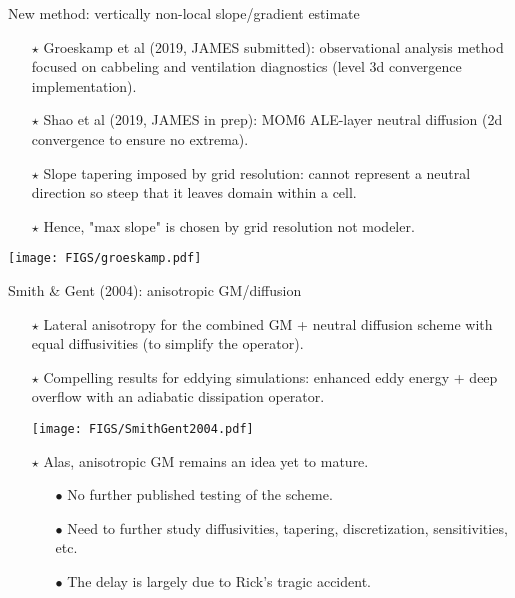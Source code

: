 \documentclass{beamer}
\begin{document}
\begin{frame}{New method: vertically non-local slope/gradient estimate}

\begin{itemize}

\item[$\star$] Groeskamp et al (2019, JAMES submitted): observational analysis method focused on cabbeling and ventilation diagnostics (level 3d convergence implementation). 

\item[$\star$] Shao et al (2019, JAMES in prep): MOM6 ALE-layer neutral diffusion (2d convergence to ensure no extrema).  

\item[$\star$] Slope tapering imposed by grid resolution: cannot represent a neutral direction so steep that it leaves domain within a cell. 

\item[$\star$]  Hence, "max slope" is chosen by grid resolution not modeler.


\end{itemize}

\begin{center}
\texttt{[image: FIGS/groeskamp.pdf]}
\label{fig:groeskamp}
\end{center}

\end{frame}




\begin{frame}{Smith \& Gent (2004): anisotropic GM/diffusion}

\begin{itemize}

\item[$\star$]  Lateral anisotropy for the combined GM + neutral diffusion scheme with equal diffusivities (to simplify the operator).   

\item[$\star$] Compelling results for eddying simulations: enhanced eddy energy + deep overflow with an adiabatic dissipation operator.   



\begin{center}
\texttt{[image: FIGS/SmithGent2004.pdf]}
\label{fig:SmithGent}
\end{center}

\item[$\star$] Alas, anisotropic GM remains an idea yet to mature.
  \begin{itemize}
      \item[$\bullet$] No further published testing of the scheme.
      \item[$\bullet$] Need to further study diffusivities, tapering, discretization, sensitivities, etc.  
      \item[$\bullet$] The delay is largely due to Rick's tragic accident.  
 \end{itemize}
\end{itemize}


\end{frame}
\end{document}
